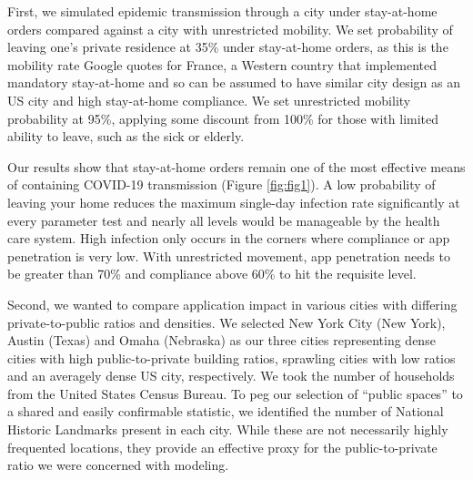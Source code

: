 \documentclass{article}
\begin{document}
First, we simulated epidemic transmission through a city under stay-at-home orders compared against a city with unrestricted mobility. We set probability of leaving one’s private residence at 35\% under stay-at-home orders, as this is the mobility rate Google quotes for France, a Western country that implemented mandatory stay-at-home and so can be assumed to have similar city design as an US city and high stay-at-home compliance\cite{MobilityReportFrance}. We set unrestricted mobility probability at 95\%, applying some discount from 100\% for those with limited ability to leave, such as the sick or elderly.

Our results show that stay-at-home orders remain one of the most effective means of containing COVID-19 transmission (Figure \ref{fig:fig1}). A low probability of leaving your home reduces the maximum single-day infection rate significantly at every parameter test and nearly all levels would be manageable by the health care system. High infection only occurs in the corners where compliance or app penetration is very low. With unrestricted movement, app penetration needs to be greater than 70\% and compliance above 60\% to hit the requisite level.

Second, we wanted to compare application impact in various cities with differing private-to-public ratios and densities. We selected New York City (New York), Austin (Texas) and Omaha (Nebraska) as our three cities representing dense cities with high public-to-private building ratios, sprawling cities with low ratios and an averagely dense US city, respectively. We took the number of households from the United States Census Bureau. To peg our selection of “public spaces” to a shared and easily confirmable statistic, we identified the number of National Historic Landmarks present in each city. While these are not necessarily highly frequented locations, they provide an effective proxy for the public-to-private ratio we were concerned with modeling.
\end{document}
